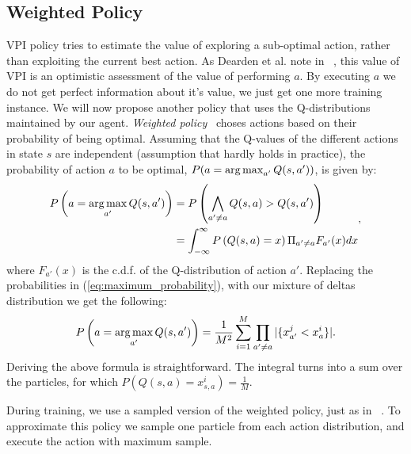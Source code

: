 \subsection{Weighted Policy}
VPI policy tries to estimate the value of exploring a sub-optimal action, rather than exploiting the current best action. As Dearden et al. note in ~\cite{Dearden98bayesianq-learning}, this value of VPI is an optimistic assessment of the value of performing $a$. By executing $a$ we do not get perfect information about it's value, we just get one more training instance. We will now propose another policy that uses the Q-distributions maintained by our agent. \emph{Weighted policy}~\cite{pmlr-v48-deramo16} choses actions based on their probability of being optimal. Assuming that the Q-values of the different actions in state $s$ are independent (assumption that hardly holds in practice), the probability of  action $a$ to be optimal, $P(a= \operatorname*{arg\,max}_{a'} Q(s,a'))$, is given by:
\begin{equation}
	\begin{split}
	P\left(a= \operatorname*{arg\,max}_{a'} Q(s,a')\right) & = P \left( \bigwedge_{a' \neq a} Q(s,a) > Q(s,a') \right)  \\
							   & = \int_{-\infty}^{\infty} P\left(Q(s,a)=x\right) \Pi_{a' \neq a} F_{a'}(x)dx
	\end{split},
	\label{eq:maximum_probability}
\end{equation}
where $F_{a'}(x)$ is the c.d.f. of the Q-distribution of action $a'$. Replacing the probabilities in (\ref{eq:maximum_probability}), with our mixture of deltas distribution we get the following:
\begin{equation}
	P\left(a= \operatorname*{arg\,max}_{a'} Q(s,a')\right) = \frac{1}{M^2} \sum_{i=1}^M \prod_{a' \neq a} |\{ x_{a'}^j < x_{a}^i \} |.
\end{equation}
Deriving the above formula is straightforward. The integral turns into a sum over the particles, for which $P(Q(s,a)=x^i_{s,a})=\frac{1}{M}$. \par
During training, we use a sampled version of the weighted policy, just as in ~\cite{Dearden98bayesianq-learning}. To approximate this policy we sample one particle from each action distribution, and execute the action with maximum sample. 
